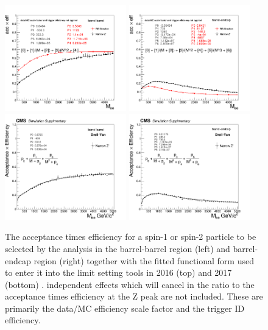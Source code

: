 \begin{figure}
  \begin{center}
    \includegraphics[width=0.47\textwidth]{figures/Zprime/2016/limitInputs/plot_acceff_BB.png}
    \includegraphics[width=0.47\textwidth]{figures/Zprime/2016/limitInputs/plot_acceff_BE.png}
    \includegraphics[width=0.47\textwidth]{figures/Zprime/2017/limitInputs/plot_acceff_BB.png}
    \includegraphics[width=0.47\textwidth]{figures/Zprime/2017/limitInputs/plot_acceff_BE.png}
    \caption{The acceptance times efficiency for a spin-1 or spin-2 particle to be selected by the analysis in the barrel-barrel region (left) and barrel-endcap region (right) together with the fitted functional form used to enter it into the limit setting tools in 2016 (top) \cite{CMS-AN-2016-404} and 2017 (bottom) \cite{CMS-AN-2018-021}. \et independent effects which will cancel in the ratio to the acceptance times efficiency at the Z peak are not included. These are primarily the data/MC efficiency scale factor and the trigger ID efficiency.}
    \label{fig:accEff}
  \end{center}
\end{figure}

